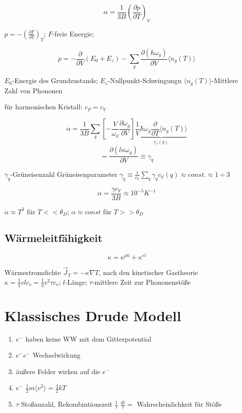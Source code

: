 \[\boxed{\alpha = \frac{1}{3B}\left( \frac{\partial p}{\partial T}\right)_V }\]


\( p = - \left( \frac{\partial F}{\partial T}\right)_T\); \(F\)-freie Energie;

 \[ p = -\frac{\partial}{\partial V}(E_0+E_z) -\sum_q\frac{\partial(\hbar \omega_g)}{\partial V}\langle n_g(T)\rangle\] 


\(E_0\)-Energie des Grundzustands; \(E_z\)-Nullpunkt-Schwingungn \(\langle n_g(T)\rangle\)-Mittlere Zahl von Phononen

für harmonischen Kristall: \(c_P=c_V\)

 
\[\alpha = \frac{1}{3B}\sum_q\left[-\frac{V}{\omega_g}\frac{\partial \omega_g}{\partial V}  \right]\underbrace{\frac{1}{V}\hbar \omega_g\frac{\partial}{\partial T}\langle n_g(T)\rangle}_{c_v(q)}\]
\[ = \frac{\partial(ln\omega_g)}{\partial V} \equiv \gamma_q\]

\(\gamma_q\)-Grüneisenzahl
Grüneisenparameter \(\gamma_q\equiv \frac{1}{c_V}\sum_q\gamma_qc_V(q)\approx const. \approx 1\div 3\)

\[\boxed{\alpha = \frac{\gamma c_V}{3B}\approx 10^{-5}K^{-1}}\]

\(\alpha\approx T^3\) für \(T<<\theta_D\); \(\alpha\approx const\) für \(T>>\theta_D\)

\subsection{Wärmeleitfähigkeit}

\[ \kappa = \kappa^{ph}+\kappa^{el}\]

Wärmestromdichte \(\vec J_T = -\kappa\nabla T\), nach den kinetischer Gastheorie \(\kappa = \frac{1}{3}vlc_v = \frac{1}{3}v^2\tau c_v\); \(l\)-Länge; \(\tau\)-mittlere Zeit zur Phononenstöße

\section{Klassisches Drude Modell}

\begin{enumerate}
\item \(e^{-}\) haben keine WW mit dem Gitterpotential
\item \(e^{-}e^{-}\) Wechselwirkung
\item äußere Felder wirken auf die \(e^{-}\)
\item  \(e^{-}\) \(\frac{1}{2}m\langle v^2\rangle =\frac{3}{2}kT\)
\item \(\tau\) Stoßanzahl, Rekombintionszeit \(\frac{1}{\tau}\) \(\frac{dt}{\tau}=\) Wahrscheinlichkeit für Stöße
\end{enumerate}

